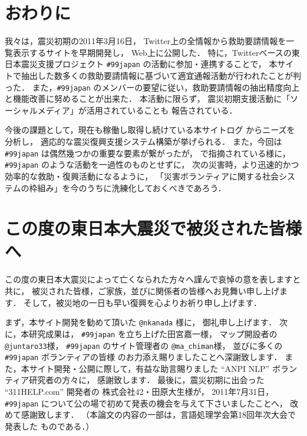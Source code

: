\documentclass[japanese]{jnlp_1.4}
\begin{document}
\section{おわりに}

我々は，震災初期の2011年3月16日，
Twitter上の全情報から救助要請情報を一覧表示するサイトを早期開発し，
Web上に公開した．
特に，Twitterベースの東日本震災支援プロジェクト {\tt \#99japan} の活動に参加・連携することで，
本サイトで抽出した数多くの救助要請情報に基づいて適宜通報活動が行われたことが判った．
{また，{\tt \#99japan} のメンバーの要望に従い，救助要請情報の抽出精度向上と機能改善に努めることが出来た．}
本活動に限らず，
震災初期支援活動に「ソーシャルメディア」が活用されていることも
報告されている\cite{NHK,Shimbun,Tachiiri}．

今後の課題として，現在も稼働し取得し続けている本サイトログ
からニーズを分析し，
適応的な震災復興支援システム構築が挙げられる．
また，今回は {\tt \#99japan} は偶然幾つかの重要な要素が繋がったが，
\cite{Endo,Utada}で指摘されている様に，{\tt \#99japan} のような活動を一過性のものとせずに，
次の災害時，より迅速的かつ効率的な救助・復興活動になるように，
「災害ボランティアに関する社会システムの枠組み」を今のうちに洗練化しておくべきであろう．



\section*{この度の東日本大震災で被災された皆様へ}

この度の東日本大震災によって亡くなられた方々へ謹んで哀悼の意を表しますと共に，
被災された皆様，ご家族，並びに関係者の皆様へお見舞い申し上げます．
そして，被災地の一日も早い復興を心よりお祈り申し上げます．


\acknowledgment

まず，本サイト開発を勧めて頂いた {\tt @nkanada} 様に，
御礼申し上げます．
次に，本研究成果は，
{\tt \#99japan} を立ち上げた田宮嘉一様，
マップ開設者の {\tt @juntaro33}様，
{\tt \#99japan} のサイト管理者の {\tt @ma\_chiman}様，
並びに多くの {\tt \#99japan} ボランティアの皆様
のお力添え賜りましたことへ深謝致します．
また，本サイト開発・公開に際して，有益な助言賜りました
``ANPI NLP'' ボランティア研究者の方々に，
感謝致します．
最後に，震災初期に出会った ``311HELP.com''\cite{311help} 開発者の
株式会社42・田原大生様が，
2011年7月31日， 
{\tt \#99japan} について公の場で初めて発表の機会を与えて下さいましたことへ，
改めて感謝致します．
（本論文の内容の一部は，言語処理学会第18回年次大会で発表した
ものである\cite{Aida1}．）
\end{document}
